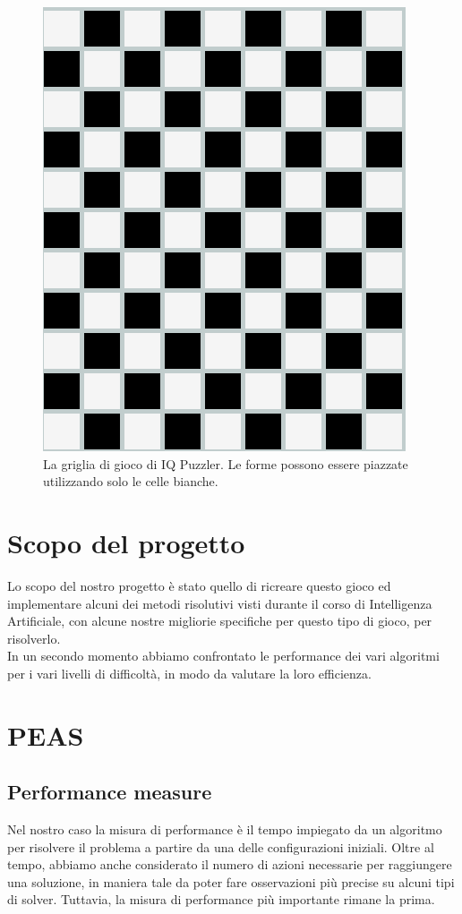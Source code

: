 \begin{figure}[h]
	\centering
	\includegraphics[scale=0.3]{immagini/griglia}
	\caption{La griglia di gioco di IQ Puzzler. Le forme possono essere piazzate utilizzando solo le celle bianche.}
	\label{fig:griglia}
\end{figure}


\newpage
\section{Scopo del progetto}
Lo scopo del nostro progetto è stato quello di ricreare questo gioco ed implementare alcuni dei metodi risolutivi visti durante il corso di Intelligenza Artificiale, con alcune nostre migliorie specifiche per questo tipo di gioco, per risolverlo. \\
In un secondo momento abbiamo confrontato le performance dei vari algoritmi per i vari livelli di difficoltà, in modo da valutare la loro efficienza.

\section{PEAS}

\subsection{Performance measure}
\label{performance}
Nel nostro caso la misura di performance è il tempo impiegato da un algoritmo per risolvere il problema a partire da una delle configurazioni iniziali. Oltre al tempo, abbiamo anche considerato il numero di azioni necessarie per raggiungere una soluzione, in maniera tale da poter fare osservazioni più precise su alcuni tipi di solver. Tuttavia, la misura di performance più importante rimane la prima.

